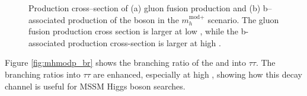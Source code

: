 \begin{figure}[h!]
\begin{center}
\end{center}
\caption{Production cross--section of (a) gluon fusion production and (b) b--associated production of the \PHiggs boson
in the $m_{h}^{\text{mod+}}$ scenario. The gluon fusion production cross section is larger at low \tanb, while
the b-associated production cross-section is larger at high \tanb.}
\label{fig:mhmodp_xs}
\end{figure}

Figure \ref{fig:mhmodp_br} shows the branching ratio of the \PHiggs and \PHiggsps 
into $\tau\tau$. The branching ratios into $\tau\tau$ are enhanced, especially at
high \tanb, showing how this decay channel is useful for MSSM Higgs boson searches.

